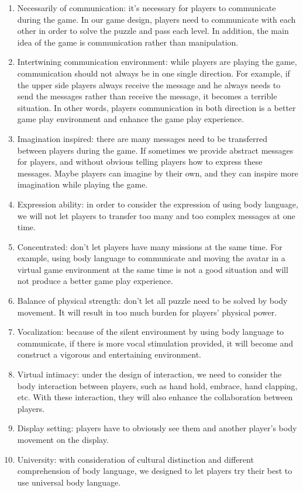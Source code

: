 \documentclass{sigchi}
\begin{document}
\begin{enumerate}
\item Necessarily of communication: 
it's necessary for players to communicate during the game. In our game design, players need to communicate with each other in order to solve the puzzle and pass each level. In addition, the main idea of the game is communication rather than manipulation.
\item Intertwining communication environment: while players are playing the game, communication should not always be in one single direction. For example, if the upper side players always receive the message and he always needs to send the messages rather than receive the message, it becomes a terrible situation. In other words, players communication in both direction is a better game play environment and enhance the game play experience.
\item Imagination inspired:
there are many messages need to be transferred between players during the game. If sometimes we provide abstract messages for players, and without obvious telling players how to express these messages. Maybe players can imagine by their own, and they can inspire more imagination while playing the game.
\item Expression ability:
in order to consider the expression of using body language, we will not let players to transfer too many and too complex messages at one time.
\item Concentrated:
don't let players have many missions at the same time. For example, using body language to communicate and moving the avatar in a virtual game environment at the same time is not a good situation and will not produce a better game play experience.
\item Balance of physical strength:
don't let all puzzle need to be solved by body movement. It will result in too much burden for players' physical power.
\item Vocalization: 
because of the silent environment by using body language to communicate, if there is more vocal stimulation provided, it will become and construct a vigorous and entertaining environment.
\item Virtual intimacy:
under the design of interaction, we need to consider the body interaction between players, such as hand hold, embrace, hand clapping, etc. With these interaction, they will also enhance the collaboration between players.
\item Display setting: 
players have to obviously see them and another player's body movement on the display.
\item University:
with consideration of cultural distinction and different comprehension of body language, we designed to let players try their best to use universal body language.

\end{enumerate}
\end{document}
